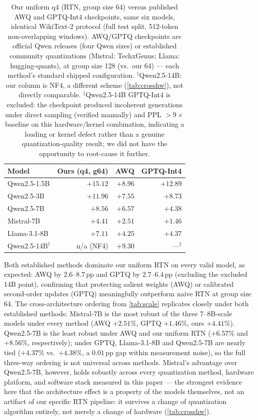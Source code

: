 \documentclass[10pt,twocolumn]{article}
\begin{document}
\begin{table}[t]
  \centering
  \caption{Our uniform q4 (RTN, group size 64) versus published AWQ and
    GPTQ-Int4 checkpoints, same six models, identical WikiText-2 protocol
    (full test split, 512-token non-overlapping windows).  AWQ/GPTQ
    checkpoints are official Qwen releases (four Qwen sizes) or established
    community quantizations (Mistral: TechxGenus; Llama: hugging-quants), at
    group size 128 (vs.\ our 64) --- each method's standard shipped
    configuration.  $^\dagger$Qwen2.5-14B: our column is NF4, a different
    scheme (\cref{tab:crosshw}), not directly comparable.
    $^\ddagger$Qwen2.5-14B GPTQ-Int4 is excluded: the checkpoint produced
    incoherent generations under direct sampling (verified manually) and
    PPL $>9\times$ baseline on this hardware/kernel combination, indicating a
    loading or kernel defect rather than a genuine quantization-quality
    result; we did not have the opportunity to root-cause it further.}
  \label{tab:awqgptq}
  \begin{tabular}{lrrr}
    \toprule
    Model & Ours (q4, g64) & AWQ & GPTQ-Int4 \\
    \midrule
    Qwen2.5-1.5B         & $+15.12$   & $+8.96$ & $+12.89$ \\
    Qwen2.5-3B           & $+11.96$   & $+7.55$ & $+8.73$  \\
    Qwen2.5-7B           & $+8.56$    & $+6.57$ & $+4.38$  \\
    Mistral-7B           & $+4.41$    & $+2.51$ & $+1.46$  \\
    Llama-3.1-8B         & $+7.11$    & $+4.25$ & $+4.37$  \\
    \midrule
    Qwen2.5-14B$^\dagger$ & n/a (NF4) & $+9.30$ & ---$^\ddagger$ \\
    \bottomrule
  \end{tabular}
\end{table}

Both established methods dominate our uniform RTN on every valid model, as
expected: AWQ by $2.6$--$8.7$\,pp and GPTQ by $2.7$--$6.4$\,pp (excluding the
excluded 14B point), confirming that protecting salient weights (AWQ) or
calibrated second-order updates (GPTQ) meaningfully outperform naive RTN at
group size 64.  The cross-architecture ordering from \cref{tab:scale}
replicates closely under both established methods: Mistral-7B is the most
robust of the three 7--8B-scale models under every method (AWQ $+2.51\%$,
GPTQ $+1.46\%$, ours $+4.41\%$).  Qwen2.5-7B is the least robust under AWQ and
our uniform RTN ($+6.57\%$ and $+8.56\%$, respectively); under GPTQ,
Llama-3.1-8B and Qwen2.5-7B are nearly tied ($+4.37\%$ vs.\ $+4.38\%$, a
$0.01$\,pp gap within measurement noise), so the full three-way ordering is
not universal across methods.  Mistral's advantage over Qwen2.5-7B, however,
holds robustly across every quantization method, hardware platform, and
software stack measured in this paper --- the strongest evidence here that
the architecture effect is a property of the models themselves, not an
artifact of our specific RTN pipeline: it survives a change of quantization
algorithm entirely, not merely a change of hardware (\cref{tab:crosshw}).
\end{document}
